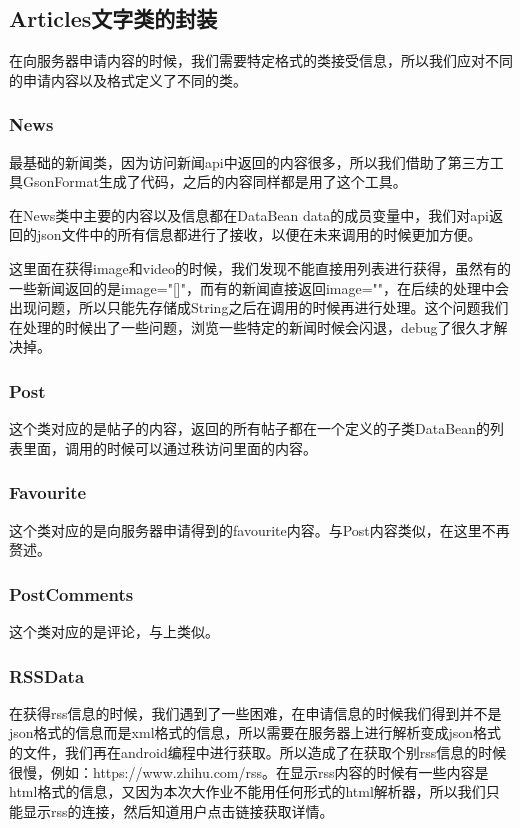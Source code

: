 \subsection{Articles文字类的封装}

在向服务器申请内容的时候，我们需要特定格式的类接受信息，所以我们应对不同的申请内容以及格式定义了不同的类。

\subsubsection{News}

最基础的新闻类，因为访问新闻api中返回的内容很多，所以我们借助了第三方工具GsonFormat生成了代码，之后的内容同样都是用了这个工具。

在News类中主要的内容以及信息都在DataBean data的成员变量中，我们对api返回的json文件中的所有信息都进行了接收，以便在未来调用的时候更加方便。

这里面在获得image和video的时候，我们发现不能直接用列表进行获得，虽然有的一些新闻返回的是image="[]"，而有的新闻直接返回image=""，在后续的处理中会出现问题，所以只能先存储成String之后在调用的时候再进行处理。这个问题我们在处理的时候出了一些问题，浏览一些特定的新闻时候会闪退，debug了很久才解决掉。

\subsubsection{Post}

这个类对应的是帖子的内容，返回的所有帖子都在一个定义的子类DataBean的列表里面，调用的时候可以通过秩访问里面的内容。

\subsubsection{Favourite}

这个类对应的是向服务器申请得到的favourite内容。与Post内容类似，在这里不再赘述。

\subsubsection{PostComments}

这个类对应的是评论，与上类似。

\subsubsection{RSSData}

在获得rss信息的时候，我们遇到了一些困难，在申请信息的时候我们得到并不是json格式的信息而是xml格式的信息，所以需要在服务器上进行解析变成json格式的文件，我们再在android编程中进行获取。所以造成了在获取个别rss信息的时候很慢，例如：https://www.zhihu.com/rss。在显示rss内容的时候有一些内容是html格式的信息，又因为本次大作业不能用任何形式的html解析器，所以我们只能显示rss的连接，然后知道用户点击链接获取详情。

